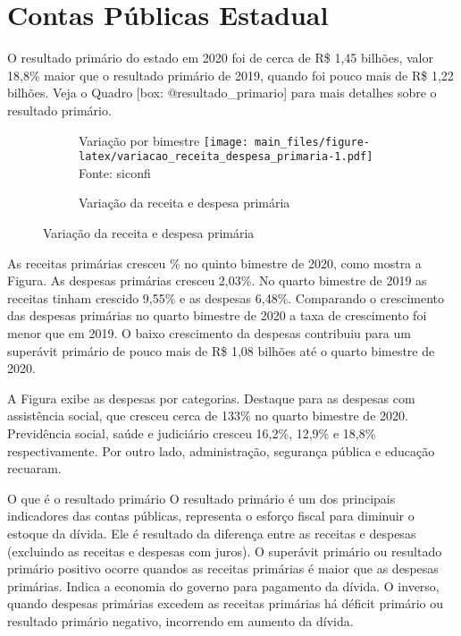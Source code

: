 \documentclass[twocolumn, a4paper, 10pt]{report}
\newcommand{\source}[1]{\scriptsize{Fonte: #1}\\}
\newcommand{\subcap}[1]{{\scriptsize\color{primarycolor}#1\newline}}
\newcommand{\abbr}[1]{\acrshort{#1}}
\begin{document}
    
    \hypertarget{contas-puxfablicas-estadual}{%
    \chapter{Contas Públicas
    Estadual}\label{contas-puxfablicas-estadual}}

    O resultado primário do estado em 2020 foi de cerca de R\$ 1,45
    bilhões, valor 18,8\% maior que o resultado primário de 2019, quando
    foi pouco mais de R\$ 1,22 bilhões. Veja o Quadro {[}box:
    @resultado\_primario{]} para mais detalhes sobre o resultado
    primário.

    \begin{figure}[!h]
    \begin{subfigure}{\linewidth}
    \caption{Variação da receita e despesa primária\label{fig:variacao_receita_despesa_primaria}}
    \subcap{Variação por bimestre}
    \texttt{[image: main\_files/figure-latex/variacao\_receita\_despesa\_primaria-1.pdf]}
    \source{\abbr{siconfi}}
    \end{subfigure}
    \end{figure}

    As receitas primárias cresceu \% no quinto bimestre de 2020, como
    mostra a Figura. As despesas primárias cresceu 2,03\%. No quarto
    bimestre de 2019 as receitas tinham crescido 9,55\% e as despesas
    6,48\%. Comparando o crescimento das despesas primárias no quarto
    bimestre de 2020 a taxa de crescimento foi menor que em 2019. O
    baixo crescimento da despesas contribuiu para um superávit primário
    de pouco mais de R\$ 1,08 bilhões até o quarto bimestre de 2020.

    A Figura exibe as despesas por categorias. Destaque para as despesas
    com assistência social, que cresceu cerca de 133\% no quarto
    bimestre de 2020. Previdência social, saúde e judiciário cresceu
    16,2\%, 12,9\% e 18,8\% respectivamente. Por outro lado,
    administração, segurança pública e educação recuaram.\\

    \begin{smbox}[label={box:resultado_primario}]{O que é o resultado primário}
    O resultado primário é um dos principais indicadores das contas
    públicas, representa o esforço fiscal para diminuir o estoque da
    dívida. Ele é resultado da diferença entre as receitas e despesas
    (excluindo as receitas e despesas com juros). O superávit primário
    ou resultado primário positivo ocorre quandos as receitas primárias
    é maior que as despesas primárias. Indica a economia do governo para
    pagamento da dívida. O inverso, quando despesas primárias excedem as
    receitas primárias há déficit primário ou resultado primário
    negativo, incorrendo em aumento da dívida.

    \end{smbox}
\end{document}
